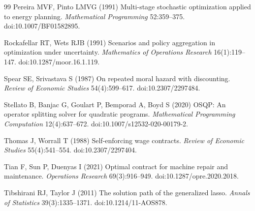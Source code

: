 \begin{thebibliography}{99}
Pereira MVF, Pinto LMVG (1991) Multi-stage stochastic optimization applied to energy planning. \emph{Mathematical Programming} 52:359--375. doi:10.1007/BF01582895.

Rockafellar RT, Wets RJB (1991) Scenarios and policy aggregation in optimization under uncertainty. \emph{Mathematics of Operations Research} 16(1):119--147. doi:10.1287/moor.16.1.119.

Spear SE, Srivastava S (1987) On repeated moral hazard with discounting. \emph{Review of Economic Studies} 54(4):599--617. doi:10.2307/2297484.

Stellato B, Banjac G, Goulart P, Bemporad A, Boyd S (2020) OSQP: An operator splitting solver for quadratic programs. \emph{Mathematical Programming Computation} 12(4):637--672. doi:10.1007/s12532-020-00179-2.

Thomas J, Worrall T (1988) Self-enforcing wage contracts. \emph{Review of Economic Studies} 55(4):541--554. doi:10.2307/2297404.

Tian F, Sun P, Duenyas I (2021) Optimal contract for machine repair and maintenance. \emph{Operations Research} 69(3):916--949. doi:10.1287/opre.2020.2018.

Tibshirani RJ, Taylor J (2011) The solution path of the generalized lasso. \emph{Annals of Statistics} 39(3):1335--1371. doi:10.1214/11-AOS878.

\end{thebibliography}
